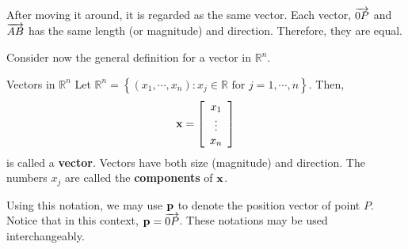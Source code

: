 \begin{center}
\par{}\label{fig:RnVectorsRn-tikz03}%

\end{center}

After moving it around, it is regarded as the same vector. Each vector, $\overrightarrow{0P}$ and $\overrightarrow{AB}$ has the same length (or magnitude) and direction. Therefore, they are equal. 

Consider now the general definition for a vector in $\mathbb{R}^n$. 

\begin{definition}{Vectors in $\mathbb{R}^n$}\label{def:vectorsRn}
Let $\mathbb{R}^{n} = \left\{ \left( x_{1}, \cdots, x_{n}\right)
:x_{j}\in \mathbb{R}\text{ for }j=1,\cdots ,n\right\} .$
Then,
\begin{equation*}
\mathbf{x}
=
\left[ \begin{array}{c}
x_{1} \\
\vdots \\
x_{n}
\end{array}
\right] 
\end{equation*}
is called a \textbf{vector}. Vectors have both size (magnitude) and direction. 
The numbers $x_{j}$ are called the \textbf{components}  of $\mathbf{x}$. 
\end{definition}

Using this notation, we may use $\mathbf{p}$ to denote the position vector of point $P$. Notice that in this context, $\mathbf{p} = \overrightarrow{0P}$. These notations may be used interchangeably. 

